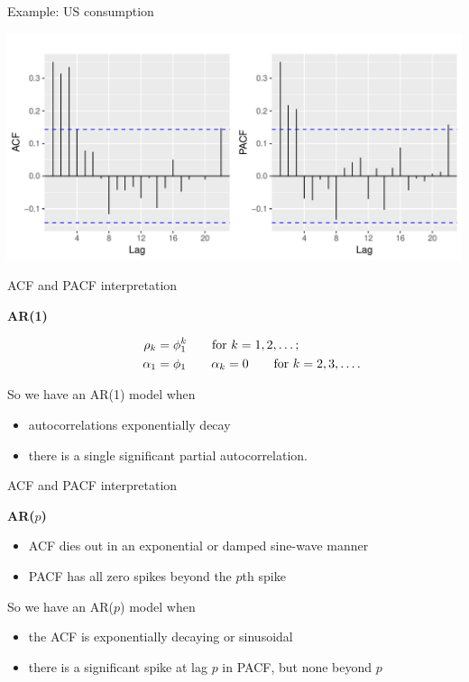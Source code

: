 \documentclass[14pt,ignorenonframetext,]{beamer}
\providecommand{\tightlist}{%
  \setlength{\itemsep}{0pt}\setlength{\parskip}{0pt}}
\begin{document}
\begin{frame}{Example: US consumption}

\includegraphics{week_5_arima_files/figure-beamer/usconsumptionacf-1.pdf}

\end{frame}

\begin{frame}{ACF and PACF interpretation}

\textbf{AR(1)}

\begin{align*}
\hspace*{1cm}\rho_k &= \phi_1^k\qquad\text{for $k=1,2,\dots$};\\
\alpha_1 &= \phi_1 \qquad\alpha_k = 0\qquad\text{for $k=2,3,\dots$}.
\end{align*}

So we have an AR(1) model when

\begin{itemize}
\tightlist
\item
  autocorrelations exponentially decay
\item
  there is a single significant partial autocorrelation.
\end{itemize}

\end{frame}

\begin{frame}{ACF and PACF interpretation}

\textbf{AR(\(p\))}

\begin{itemize}
\tightlist
\item
  ACF dies out in an exponential or damped sine-wave manner
\item
  PACF has all zero spikes beyond the \(p\)th spike
\end{itemize}

So we have an AR(\(p\)) model when

\begin{itemize}
\tightlist
\item
  the ACF is exponentially decaying or sinusoidal
\item
  there is a significant spike at lag \(p\) in PACF, but none beyond
  \(p\)
\end{itemize}

\end{frame}
\end{document}
